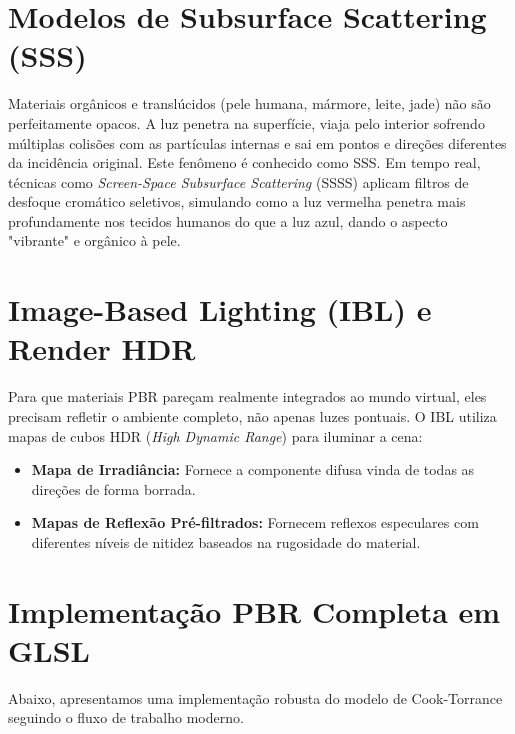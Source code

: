 \section{Modelos de Subsurface Scattering (SSS)}

Materiais orgânicos e translúcidos (pele humana, mármore, leite, jade) não são perfeitamente opacos. A luz penetra na superfície, viaja pelo interior sofrendo múltiplas colisões com as partículas internas e sai em pontos e direções diferentes da incidência original. Este fenômeno é conhecido como SSS. Em tempo real, técnicas como \textit{Screen-Space Subsurface Scattering} (SSSS) aplicam filtros de desfoque cromático seletivos, simulando como a luz vermelha penetra mais profundamente nos tecidos humanos do que a luz azul, dando o aspecto "vibrante" e orgânico à pele.

\section{Image-Based Lighting (IBL) e Render HDR}

Para que materiais PBR pareçam realmente integrados ao mundo virtual, eles precisam refletir o ambiente completo, não apenas luzes pontuais. O IBL utiliza mapas de cubos HDR (\textit{High Dynamic Range}) para iluminar a cena:
\begin{itemize}
    \item \textbf{Mapa de Irradiância:} Fornece a componente difusa vinda de todas as direções de forma borrada.
    \item \textbf{Mapas de Reflexão Pré-filtrados:} Fornecem reflexos especulares com diferentes níveis de nitidez baseados na rugosidade do material.
\end{itemize}

\section{Implementação PBR Completa em GLSL}

Abaixo, apresentamos uma implementação robusta do modelo de Cook-Torrance seguindo o fluxo de trabalho moderno.

